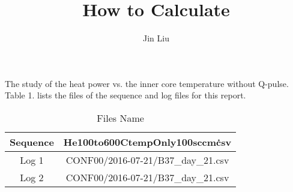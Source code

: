 \documentclass{article}
\title{How to Calculate }
\author{Jin Liu}
\begin{document}
\maketitle


The study of the heat power vs. the inner core temperature without Q-pulse.\\
Table 1. lists the files of the sequence and log files for this report.

\begin{table}
[h]
\centering
\caption{Files Name}
\begin{tabular}{|c|c|}
\hline
Sequence & He100to600CtempOnly100sccm\.csv\\ \hline
Log 1 & CONF00/2016-07-21/B37\_day\_21.csv\\  \hline
Log 2 & CONF00/2016-07-21/B37\_day\_21.csv\\ \hline
\end{tabular}
\end{table}
\end{document}
